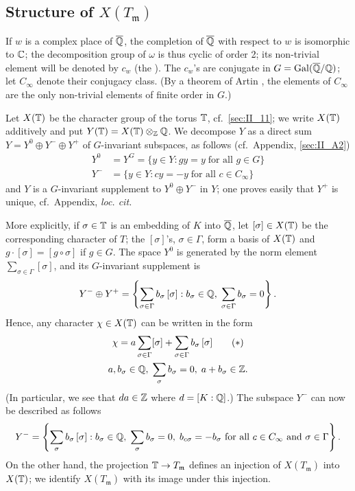 \subsection{Structure of \texorpdfstring{$X(T_{\mathfrak{m}})$}{X(Tm)}}
\label{sec:II_31}
If $w$ is a complex place of $\overline{\mathbb{Q}}$, the completion of $\overline{\mathbb{Q}}$ with
respect to $w$ is isomorphic to $\mathbb{C}$; the decomposition group of $\omega$ is
thus cyclic of order 2; its non-trivial element will be denoted by $c_w$ (the
). The $c_w$'s are conjugate in
$G = \operatorname{Gal}(\overline{\mathbb{Q}}/\mathbb{Q})$; let $C_\infty$ denote their conjugacy class. (By a
theorem of Artin \cite[257]{1}, the elements of $C_\infty$ are the only
non-trivial elements of finite order in $G$.)

Let $X(\mathbb{T})$ be the character group of the torus $\mathbb{T}$, cf.\ \ref{sec:II_11}; we
write $X(\mathbb{T})$ additively and put $Y(\mathbb{T}) = X(\mathbb{T}) \otimes_{\mathbb{Z}} \mathbb{Q}$. We decompose
$Y$ as a direct sum $Y = Y^0 \oplus Y^- \oplus Y^+$ of $G$-invariant subspaces, as
follows (cf.\ Appendix, \ref{sec:II_A2})
\begin{align*}
	Y^0 &= Y^G = \{ y \in Y : gy = y \; \text{for all } g\in G \} \\
	Y^- &= \{ y \in Y : cy = -y \; \text{for all } c\in C_\infty \}
\end{align*}
and $Y$ is a $G$-invariant supplement to $Y^0 \oplus Y^-$ in $Y$; one proves
\dpage
easily that $Y^+$ is unique, cf.\ Appendix, \emph{loc. cit.}

More explicitly, if $\sigma \in \mathbb{T}$ is an embedding of $K$ into $\overline{\mathbb{Q}}$,
let $[\sigma] \in X(\mathbb{T})$ be the corresponding character of $T$; the
$[\sigma]$'s, $\sigma \in \Gamma$, form a basis of $X(\mathbb{T})$ and $g\cdot[\sigma]
= [g\circ\sigma]$ if $g \in G$. The space $Y^0$ is generated by the norm
element $\sum_{\sigma \in \Gamma} [\sigma]$, and its $G$-invariant supplement
is
\[
	Y^- \oplus Y^+ = \left\{ \sum_{\sigma \in \Gamma} b_\sigma \, [\sigma]
	: b_\sigma \in \mathbb{Q}, \; \sum_{\sigma \in \Gamma} b_\sigma = 0 \right\}.
\]
Hence, any character $\chi \in X(\mathbb{T})$ can be written in the form
\begin{gather}
	\chi = a \sum_{\sigma\in \Gamma} [\sigma] + \sum_{\sigma \in \Gamma}
	b_\sigma \, [\sigma] \tag{$*$}\label{eqn:II_31_star} \\
	a, b_\sigma \in \mathbb{Q}, \; \sum_{\sigma} b_\sigma = 0, \; a + b_\sigma \in
	\mathbb{Z}. \notag
\end{gather}
(In particular, we see that $da \in \mathbb{Z}$ where $d = [K : \mathbb{Q}]$.) The subspace
$Y^-$ can now be described as follows
\[
	Y^- = \left\{ \sum_{\sigma} b_\sigma \, [\sigma] : b_\sigma \in \mathbb{Q}, \;
	\sum_{\sigma} b_\sigma = 0, \; b_{c\sigma} = -b_\sigma \text{ for all }
	c \in C_\infty \text{ and } \sigma \in \Gamma \right\}.
\]
On the other hand, the projection $\mathbb{T} \to T_{\mathfrak{m}}$ defines an
injection of $X(T_{\mathfrak{m}})$ into $X(\mathbb{T})$; we identify
$X(T_{\mathfrak{m}})$ with its image under this injection.


